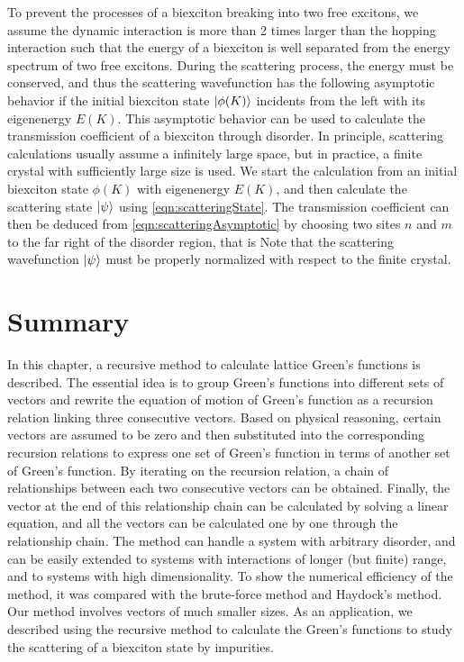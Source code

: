 To prevent the processes of a biexciton breaking into two free excitons, we assume the dynamic interaction is more
than 2 times larger than the hopping interaction such that the energy of a biexciton is well separated from the 
energy spectrum of two free excitons. 
During the scattering process, the energy must be conserved, and thus the
scattering wavefunction has the following asymptotic behavior
if the initial biexciton state $| \phi(K) \rangle$ incidents from the left with its eigenenergy $E(K)$. 
This asymptotic behavior can be used to calculate the transmission coefficient of a biexciton through disorder. 
In principle, scattering calculations usually assume a infinitely large space, but in practice, a finite crystal  
with sufficiently large size is used. We start the calculation from an initial biexciton state $\phi(K)$ with
eigenenergy $E(K)$, and then calculate the scattering state $| \psi \rangle$ using \autoref{eqn:scatteringState}. 
The transmission coefficient can then be deduced from \autoref{eqn:scatteringAsymptotic} by choosing two sites
$n$ and $m$ to the far right of the disorder region, that is
Note that the scattering wavefunction $| \psi \rangle$ must be properly normalized with respect to the finite crystal. 

\section{Summary}
\label{sec:summaryGreenFunc}

In this chapter, a recursive method to calculate lattice Green's functions is described. The essential idea 
is to group Green's functions into different sets of vectors and rewrite the equation of motion of Green's function as a 
recursion relation linking three consecutive vectors. Based on physical reasoning, certain vectors are 
assumed to be zero and then substituted into the corresponding recursion relations to express one set
of Green's function in terms of another set of Green's function. By iterating on the recursion relation, a 
chain of relationships between each two consecutive vectors can be obtained. Finally, the vector at the end of this 
relationship chain can be calculated by solving a linear equation, and all the vectors can be calculated one by one
through the relationship chain.   
The method can handle a system with arbitrary 
disorder, and can be easily extended to systems with interactions of longer (but finite) range, and to systems with
high dimensionality. To show the numerical efficiency of the method, it was compared with the brute-force method and
 Haydock's method.  Our method involves vectors of much smaller sizes. As an 
application, we described using the recursive method to calculate the Green's functions  to study the 
scattering of a biexciton state by impurities. 
 
